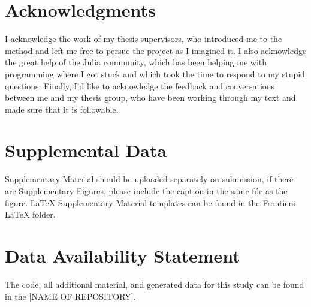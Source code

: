 \documentclass[utf8]{FrontiersinVancouver}
\begin{document}
\section*{Acknowledgments}
I acknowledge the work of my thesis supervisors, who introduced me to the method and left me free to persue the project as I imagined it. I also acknowledge the great help of the Julia community, which has been helping me with programming where I got stuck and which took the time to respond to my stupid questions. Finally, I'd like to acknowledge the feedback and conversations between me and my thesis group, who have been working through my text and made sure that it is followable.

\section*{Supplemental Data}
 \href{http://home.frontiersin.org/about/author-guidelines#SupplementaryMaterial}{Supplementary Material} should be uploaded separately on submission, if there are Supplementary Figures, please include the caption in the same file as the figure. LaTeX Supplementary Material templates can be found in the Frontiers LaTeX folder.

\section*{Data Availability Statement}
The code, all additional material, and generated data for this study can be found in the [NAME OF REPOSITORY]{}.



\end{document}
